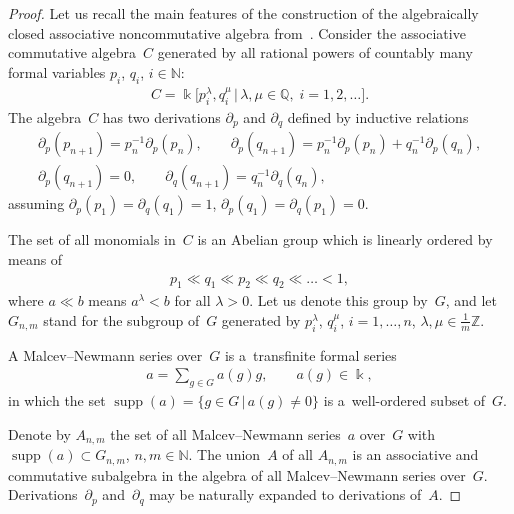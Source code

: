 \documentclass[pdftex]{sigma}
\DeclareMathOperator{\supp}{supp}
\begin{document}
\begin{proof}
Let us recall the main features of the construction of the algebraically closed associative noncommutative algebra
from~\cite{LML85}.
Consider the associative commutative algebra~$C$ generated by all rational powers of countably many formal variables
$p_i$, $q_i$, $i\in \mathbb N$:
\begin{gather*}
C = \Bbbk\big[p_i^\lambda, q_i^\mu \,\big|\, \lambda,\mu\in \mathbb Q,\; i=1,2,\dots\big].
\end{gather*}
The algebra~$C$ has two derivations $\partial_p$ and $\partial_q$ def\/ined by inductive relations
\begin{gather*}
\partial_p(p_{n+1}) = p_n^{-1}\partial_p(p_n),
\qquad
\partial_p(q_{n+1}) = p_n^{-1}\partial_p(p_n) + q_n^{-1}\partial_p(q_n),
\\
\partial_p(q_{n+1}) = 0,
\qquad
\partial_q(q_{n+1}) = q_n^{-1}\partial_q(q_n),
\end{gather*}
assuming $\partial_p(p_1)=\partial_q(q_1)=1$, $\partial_p(q_1)=\partial_q(p_1)=0$.

The set of all monomials in~$C$ is an Abelian group which is linearly ordered by means of
\begin{gather*}
p_1 \ll q_1 \ll p_2 \ll q_2 \ll \dots <1,
\end{gather*}
where $a\ll b$ means $a^\lambda <b$ for all $\lambda >0$.
Let us denote this group by~$G$, and let $G_{n,m}$ stand for the subgroup of~$G$ generated by $ p_i^\lambda $, $q_i^\mu
$, $i=1,\dots, n$, $\lambda,\mu \in \frac{1}{m}\mathbb Z$.

A Malcev--Newmann series over~$G$ is a~transf\/inite formal series
\begin{gather*}
a = \sum\limits_{g\in G} a(g) g,
\qquad
a(g)\in \Bbbk,
\end{gather*}
in which the set $\supp(a) = \{g\in G\,|\, a(g)\ne 0\}$ is a~well-ordered subset of~$G$.

Denote by $A_{n,m}$ the set of all Malcev--Newmann series~$a$ over~$G$ with $\supp(a)\subset G_{n,m}$, $n,m\in
\mathbb N$.
The union~$A$ of all $A_{n,m}$ is an associative and commutative subalgebra in the algebra of all Malcev--Newmann series
over~$G$.
Derivations~$\partial_p$ and~$\partial_q$ may be naturally expanded to derivations of~$A$.


\end{proof}
\end{document}
